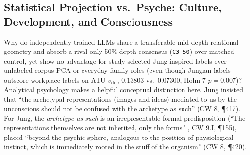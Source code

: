 \documentclass[conference]{IEEEtran}
\begin{document}
\subsection{Statistical Projection vs.\ Psyche: Culture, Development, and Consciousness}
\label{sec:psyche}
Why do independently trained LLMs share a transferable mid-depth relational geometry and absorb a rival-only 50\%-depth consensus (\texttt{C3\_50}) over matched control, yet show no advantage for study-selected Jung-inspired labels over unlabeled corpus PCA or everyday family roles (even though Jungian labels outscore workplace labels on ATU $v_{\text{dir}}$, $0.13803$ vs.\ $0.07300$, Holm-7 $p=0.007$)? Analytical psychology makes a helpful conceptual distinction here. Jung insisted that ``the archetypal representations (images and ideas) mediated to us by the unconscious should not be confused with the archetype as such'' \cite{jung1969structure} (CW 8, \P417). For Jung, the \textit{archetype-as-such} is an irrepresentable formal predisposition (``The representations themselves are not inherited, only the forms'' \cite{jung1968archetypes}, CW 9.I, \P155), placed ``beyond the psychic sphere, analogous to the position of physiological instinct, which is immediately rooted in the stuff of the organism'' \cite{jung1969structure} (CW 8, \P420).
\end{document}
